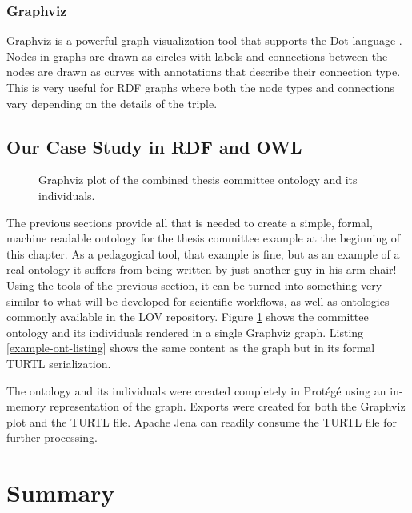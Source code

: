 \subsubsection{Graphviz}

Graphviz is a powerful graph visualization tool that supports the Dot language
\cite{noauthor_graphviz_nodate}. Nodes in graphs are drawn as circles with
labels and connections between the nodes are drawn as curves with annotations
that describe their connection type. This is very useful for RDF graphs where
both the node types and connections vary depending on the details of the triple.

\subsection{Our Case Study in RDF and OWL}

\begin{figure}[htbp]
\centering
{}
\caption{Graphviz plot of the combined thesis committee ontology and its
individuals.}
\label{example-ont-graphic}
\end{figure}

The previous sections provide all that is needed to create a simple,
formal, machine readable ontology for the thesis committee example at the
beginning of this chapter. As a pedagogical tool, that example is fine, but as
an example of a real ontology it suffers from being written by just another guy
in his arm chair! Using the tools of the previous section, it can be turned
into something very similar to what will be developed for scientific workflows,
as well as ontologies commonly available in the LOV
repository. Figure \ref{example-ont-graphic} shows the committee ontology and
its individuals rendered in a single Graphviz graph. Listing
\ref{example-ont-listing} shows the same content as the graph but in its
formal TURTL serialization.



The ontology and its individuals were created completely in Prot\'eg\'e using an
in-memory representation of the graph. Exports were created for both the
Graphviz plot and the TURTL file. Apache Jena can readily consume the TURTL file
for further processing.

\section{Summary}

